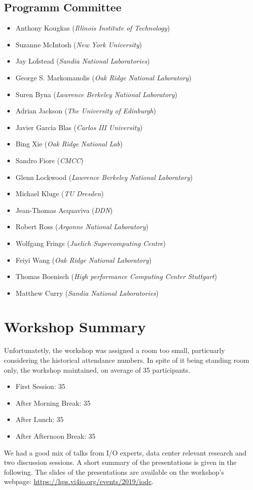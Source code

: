 \documentclass{llncs}
\begin{document}
\subsection{Programm Committee}
\begin{itemize}

\item Anthony Kougkas (\textit{Illinois Institute of Technology})
\item Suzanne McIntosh (\textit{New York University})
\item Jay Lofstead (\textit{Sandia National Laboratories})
\item George S. Markomanolis (\textit{Oak Ridge National Laboratory})
\item Suren Byna (\textit{Lawrence Berkeley National Laboratory})
\item Adrian Jackson (\textit{The University of Edinburgh})
\item Javier Garcia Blas (\textit{Carlos III University})
\item Bing Xie (\textit{Oak Ridge National Lab})
\item Sandro Fiore (\textit{CMCC})
\item Glenn Lockwood (\textit{Lawrence Berkeley National Laboratory})
\item Michael Kluge (\textit{TU Dresden})
\item Jean-Thomas Acquaviva (\textit{DDN})
\item Robert Ross (\textit{Argonne National Laboratory})
\item Wolfgang Frings (\textit{Juelich Supercomputing Centre})
\item Feiyi Wang (\textit{Oak Ridge National Laboratory})
\item Thomas Boenisch (\textit{High performance Computing Center Stuttgart})
\item Matthew Curry (\textit{Sandia National Laboratories})

\end{itemize}

\section{Workshop Summary}
\label{sec:summary}

Unfortunatetly, the workshop was assigned a room too small, particuarly considering the historical attendance numbers. In spite of it being standing room only, the workshop maintained, on average of 35 participants.
\begin{itemize}
\item First Session: 35
\item After Morning Break: 35
\item After Lunch: 35
\item After Afternoon Break: 35
\end{itemize}
We had a good mix of talks from I/O experts, data center relevant research and  two discussion sessions.
A short summary of the presentations is given in the following.
The slides of the presentations are available on the workshop's webpage:
\url{https://hps.vi4io.org/events/2019/iodc}.
\end{document}
